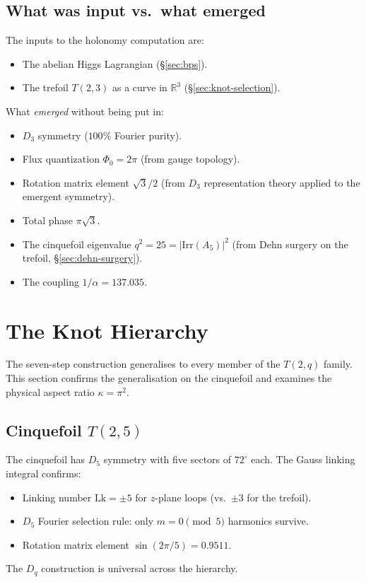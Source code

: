 \documentclass[11pt]{article}
\begin{document}
\subsection{What was input vs.\ what emerged}

The inputs to the holonomy computation are:
\begin{itemize}\setlength\itemsep{0pt}
  \item The abelian Higgs Lagrangian (\S\ref{sec:bps}).
  \item The trefoil $T(2,3)$ as a curve in $\mathbb{R}^3$
    (\S\ref{sec:knot-selection}).
\end{itemize}
What \emph{emerged} without being put in:
\begin{itemize}\setlength\itemsep{0pt}
  \item $D_3$ symmetry ($100\%$ Fourier purity).
  \item Flux quantization $\Phi_0 = 2\pi$ (from gauge topology).
  \item Rotation matrix element $\sqrt{3}/2$ (from $D_3$ representation
    theory applied to the emergent symmetry).
  \item Total phase $\pi\sqrt{3}$.
  \item The cinquefoil eigenvalue $q^2 = 25 = |\mathrm{Irr}(A_5)|^2$
    (from Dehn surgery on the trefoil,
    \S\ref{sec:dehn-surgery}).
  \item The coupling $1/\alpha = 137.035$.
\end{itemize}


\section{The Knot Hierarchy}
\label{sec:hierarchy}

The seven-step construction generalises to every member of the
$T(2,q)$ family.  This section confirms the generalisation on
the cinquefoil and examines the physical aspect ratio
$\kappa = \pi^2$.

\subsection{Cinquefoil $T(2,5)$}

The cinquefoil has $D_5$ symmetry with five sectors of $72^\circ$
each.  The Gauss linking integral confirms:
\begin{itemize}\setlength\itemsep{0pt}
  \item Linking number $\mathrm{Lk} = \pm 5$ for $z$-plane loops
    (vs.\ $\pm 3$ for the trefoil).
  \item $D_5$ Fourier selection rule: only $m = 0 \pmod{5}$
    harmonics survive.
  \item Rotation matrix element $\sin(2\pi/5) = 0.9511$.
\end{itemize}
The $D_q$ construction is universal across the hierarchy.
\end{document}
